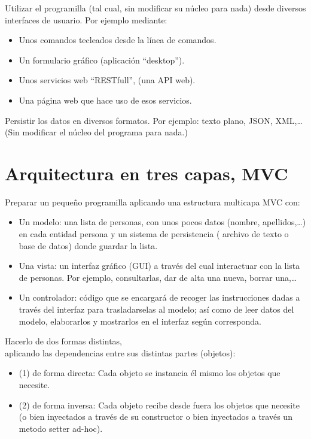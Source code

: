 \documentclass[spanish,12pt,a4paper,final,oneside]{book}
\begin{document}
Utilizar el programilla (tal cual, sin modificar su núcleo para nada) desde diversos interfaces de usuario. Por ejemplo mediante:
\begin{itemize}
\item Unos comandos tecleados desde la línea de comandos.
\item Un formulario gráfico (aplicación ``desktop'').
\item Unos servicios web ``RESTfull'', (una API web).
\item Una página web que hace uso de esos servicios.
\end{itemize}

Persistir los datos en diversos formatos. Por ejemplo: texto plano, JSON, XML,\ldots (Sin modificar el núcleo del programa para nada.)



\section{Arquitectura en tres capas, MVC}\label{ejercicio_mvc}
Preparar un pequeño programilla aplicando una estructura multicapa MVC con:
\begin{itemize}

\item Un modelo: una lista de personas, con unos pocos datos (nombre, apellidos,\ldots) en cada entidad persona y un sistema de persistencia (  archivo de texto o base de datos) donde guardar la lista.

\item Una vista: un interfaz gráfico (GUI) a través del cual interactuar con la lista de personas. Por ejemplo, consultarlas, dar de alta una nueva, borrar una,\ldots

\item Un controlador: código que se encargará de recoger las instrucciones dadas a través del interfaz para trasladarselas al modelo; así como de leer datos del modelo, elaborarlos y mostrarlos en el interfaz según corresponda.

\end{itemize}

Hacerlo de dos formas distintas,
\\aplicando las dependencias entre sus distintas partes (objetos):
\begin{itemize}

\item (1) de forma directa: Cada objeto se instancia él mismo los objetos que necesite.

\item (2) de forma inversa: Cada objeto recibe desde fuera los objetos que necesite \footnotesize{(o bien inyectados a través de su constructor o bien inyectados a través un metodo setter ad-hoc)}.

\end{itemize}
\end{document}

